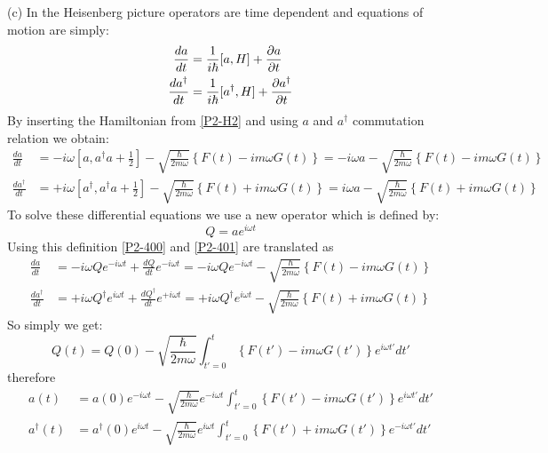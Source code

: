 \begin{homeworkProblem}
\begin{homeworkSection}{(c)} 
 In the Heisenberg picture operators are time dependent and equations of motion are simply:
\begin{align}
\frac{da}{dt}&=\frac{1}{i\hbar}[a,H]+\dfrac{\partial a}{\partial t}\\
\frac{da^\dagger}{dt}&=\frac{1}{i\hbar}[a^\dagger,H]+\dfrac{\partial a^\dagger}{\partial t}
\end{align}
By inserting the Hamiltonian from \eqref{P2-H2} and using $a$ and $a^\dagger$  commutation relation we obtain:
\begin{align}
\frac{da}{dt}&=-i\omega [a,a^\dagger a+\frac{1}{2}]-\sqrt{\frac{\hbar}{2m\omega}}\left\{F(t)-im\omega G(t)\right\}=-i\omega a-\sqrt{\frac{\hbar}{2m\omega}}\left\{F(t)-im\omega G(t)\right\}\label{P2-400}\\
\frac{da^\dagger}{dt}&=+i\omega [a^\dagger,a^\dagger a+\frac{1}{2}]-\sqrt{\frac{\hbar}{2m\omega}}\left\{F(t)+im\omega G(t)\right\}=i\omega a -\sqrt{\frac{\hbar}{2m\omega}}\left\{F(t)+im\omega G(t)\right\}\label{P2-401}
\end{align}
To solve these differential equations we use a new operator which is defined by:
\begin{equation}
Q=a e^{i\omega t}
\end{equation}
Using this definition \eqref{P2-400} and \eqref{P2-401} are translated as 
\begin{align}
\frac{da}{dt}&=-i\omega Q e^{-i\omega t}+\frac{dQ}{dt}e^{-i\omega t}=-i\omega Q e^{-i\omega t}-\sqrt{\frac{\hbar}{2m\omega}}\left\{F(t)-im\omega G(t)\right\}\\
\frac{da^\dagger}{dt}&=+i\omega Q^\dagger e^{i\omega t}+\frac{dQ^\dagger}{dt}e^{+i\omega t}=+i\omega Q^\dagger e^{i\omega t}-\sqrt{\frac{\hbar}{2m\omega}}\left\{F(t)+im\omega G(t)\right\}
\end{align}
So simply we get:
\begin{equation}
Q(t)=Q(0)-\sqrt{\frac{\hbar}{2m\omega}}\int_{t'=0}^t \left\{F(t')-im\omega G(t')\right\}e^{i\omega t'}dt'
\end{equation}
therefore
\begin{align}
a(t)&=a(0)e^{-i\omega t}-\sqrt{\frac{\hbar}{2m\omega}}e^{-i\omega t}\int_{t'=0}^t \left\{F(t')-im\omega G(t')\right\}e^{i\omega t'}dt'\\
a^\dagger(t)&=a^\dagger(0)e^{i\omega t}-\sqrt{\frac{\hbar}{2m\omega}}e^{i\omega t}\int_{t'=0}^t \left\{F(t')+im\omega G(t')\right\}e^{-i\omega t'}dt'
\end{align}
\end{homeworkSection}

\end{homeworkProblem}
